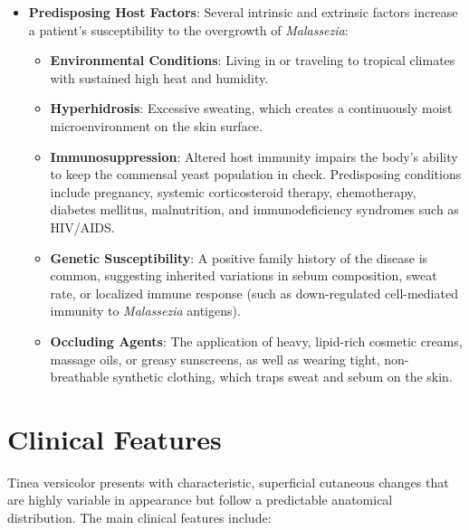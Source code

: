 \begin{itemize}
\begin{itemize}
        \item \textbf{Hyperpigmentation}: The mechanism behind hyperpigmentation is less fully understood but is believed to be driven by a low-grade, subclinical inflammatory reaction in the dermis and epidermis in response to the fungal overgrowth. This inflammation stimulates melanocyte activity, leading to post-inflammatory hyperpigmentation. Ultrastructural studies have also shown that hyperpigmented lesions contain abnormally large melanosomes and a thicker stratum corneum, which alters light scattering and makes the skin appear darker.
    \end{itemize}
    \item \textbf{Predisposing Host Factors}: Several intrinsic and extrinsic factors increase a patient's susceptibility to the overgrowth of \textit{Malassezia}:
    \begin{itemize}
        \item \textbf{Environmental Conditions}: Living in or traveling to tropical climates with sustained high heat and humidity.
        \item \textbf{Hyperhidrosis}: Excessive sweating, which creates a continuously moist microenvironment on the skin surface.
        \item \textbf{Immunosuppression}: Altered host immunity impairs the body's ability to keep the commensal yeast population in check. Predisposing conditions include pregnancy, systemic corticosteroid therapy, chemotherapy, diabetes mellitus, malnutrition, and immunodeficiency syndromes such as HIV/AIDS.
        \item \textbf{Genetic Susceptibility}: A positive family history of the disease is common, suggesting inherited variations in sebum composition, sweat rate, or localized immune response (such as down-regulated cell-mediated immunity to \textit{Malassezia} antigens).
        \item \textbf{Occluding Agents}: The application of heavy, lipid-rich cosmetic creams, massage oils, or greasy sunscreens, as well as wearing tight, non-breathable synthetic clothing, which traps sweat and sebum on the skin.
    \end{itemize}
\end{itemize}

\section*{Clinical Features}
Tinea versicolor presents with characteristic, superficial cutaneous changes that are highly variable in appearance but follow a predictable anatomical distribution. The main clinical features include:


